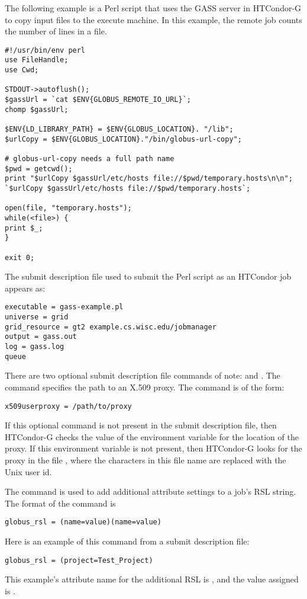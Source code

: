 The following example is a Perl script that uses the GASS server in HTCondor-G
to copy input files to the execute machine.
In this example, the remote job
counts the number of lines in a file.

\footnotesize
\begin{verbatim}
#!/usr/bin/env perl
use FileHandle;
use Cwd;

STDOUT->autoflush();
$gassUrl = `cat $ENV{GLOBUS_REMOTE_IO_URL}`;
chomp $gassUrl;

$ENV{LD_LIBRARY_PATH} = $ENV{GLOBUS_LOCATION}. "/lib";
$urlCopy = $ENV{GLOBUS_LOCATION}."/bin/globus-url-copy";

# globus-url-copy needs a full path name
$pwd = getcwd();
print "$urlCopy $gassUrl/etc/hosts file://$pwd/temporary.hosts\n\n";
`$urlCopy $gassUrl/etc/hosts file://$pwd/temporary.hosts`;

open(file, "temporary.hosts");
while(<file>) {
print $_;
}

exit 0;
\end{verbatim}
\normalsize

The submit description file used to submit the Perl script as
an HTCondor job appears as:

\footnotesize
\begin{verbatim}
executable = gass-example.pl
universe = grid
grid_resource = gt2 example.cs.wisc.edu/jobmanager
output = gass.out
log = gass.log
queue
\end{verbatim}
\normalsize

There are two optional submit description file commands
of note:
 and
.
The  command specifies the path to
an X.509 proxy.
The command is of the form:
\begin{verbatim}
x509userproxy = /path/to/proxy
\end{verbatim}
If this optional command is not present in the submit description file,
then HTCondor-G checks the value of the environment variable
 for the location of the proxy.
If this environment variable is not present, then HTCondor-G
looks for the proxy in the file
,
where the characters \verb@XXXX@ in this file name are
replaced with the Unix user id.

The  command is used to add additional
attribute settings to a job's RSL string.
The format of the  command is
\begin{verbatim}
globus_rsl = (name=value)(name=value)
\end{verbatim}
Here is an example of this command from a submit description file:
\begin{verbatim}
globus_rsl = (project=Test_Project)
\end{verbatim}
This example's attribute name for the additional RSL is
, and the value assigned is .


